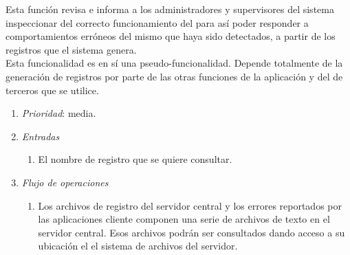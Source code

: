 

	Esta función revisa e informa a los administradores y supervisores del sistema inspeccionar del correcto funcionamiento del \software para así poder responder a comportamientos erróneos del mismo que haya sido detectados, a partir de los registros que el sistema genera.\\

	Esta funcionalidad es en sí una pseudo-funcionalidad. Depende totalmente de la generación de registros por parte de las otras funciones de la aplicación y del \software de terceros que se utilice.

\begin{enumerate}
	\item \textit{Prioridad}: media.
	\item \textit{Entradas}
	\begin{enumerate}
		\item El nombre de registro que se quiere consultar.
	\end{enumerate}
	\item \textit{Flujo de operaciones}
	\begin{enumerate}
		\item Los archivos de registro del servidor central y los errores reportados por las aplicaciones cliente componen una serie de archivos de texto en el servidor central. Esos archivos podrán ser consultados dando acceso a su ubicación el el sistema de archivos del servidor.
	\end{enumerate}
\end{enumerate}
